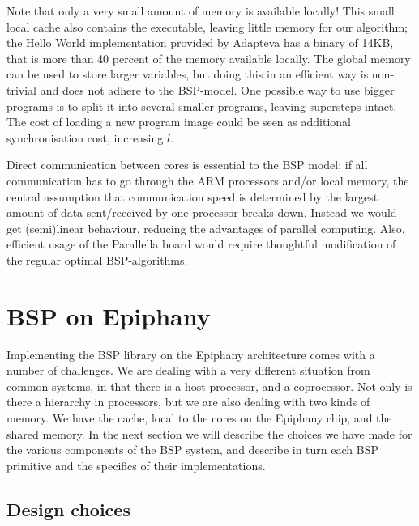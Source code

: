 \documentclass[fleqn]{article}
\renewcommand{\(}{\left(}
\renewcommand{\)}{\right)}
\def\tm{$^{\hbox{\tiny TM}}$~}
\renewcommand{\tm}{ }
\begin{document}
Note that only a very small amount of memory is available locally! This small local cache also contains the executable, leaving little memory for our algorithm; the Hello World implementation provided by Adapteva has a binary of 14KB, that is more than 40 percent of the memory available locally. The global memory can be used to store larger variables, but doing this in an efficient way is non-trivial and does not adhere to the BSP-model. One possible way to use bigger programs is to split it into several smaller programs, leaving supersteps intact. The cost of loading a new program image could be seen as additional synchronisation cost, increasing $l$.

Direct communication between cores is essential to the BSP model; if all communication has to go through the ARM processors and/or local memory, the central assumption that communication speed is determined by the largest amount of data sent/received by one processor breaks down. Instead we would get (semi)linear behaviour, reducing the advantages of parallel computing. Also, efficient usage of the Parallella board would require thoughtful modification of the regular optimal BSP-algorithms. 


\section{BSP on Epiphany\tm}

Implementing the BSP library on the Epiphany\tm architecture comes with a number of challenges. We are dealing with a very different situation from common systems, in that there is a host processor, and a coprocessor. Not only is there a hierarchy in processors, but we are also dealing with two kinds of memory. We have the cache, local to the cores on the Epiphany chip, and the shared memory. In the next section we will describe the choices we have made for the various components of the BSP system, and describe in turn each BSP primitive and the specifics of their implementations.

\subsection{Design choices}
\end{document}

